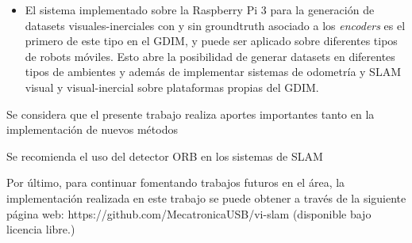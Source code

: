 \begin{itemize}
	\item  El sistema implementado sobre la Raspberry Pi 3 para la generación de datasets visuales-inerciales con y sin groundtruth asociado a los \textit{encoders} es el primero de este tipo en el GDIM, y puede ser aplicado sobre diferentes tipos de robots móviles. Esto abre la posibilidad de generar datasets en diferentes tipos de ambientes y además de implementar sistemas de odometría y SLAM visual y visual-inercial sobre plataformas propias del GDIM.
\end{itemize}


Se considera que el presente trabajo realiza aportes importantes tanto en la implementación de nuevos métodos 

Se recomienda el uso del detector ORB en los sistemas de SLAM  

Por último, para continuar fomentando trabajos futuros en el área, la implementación realizada en este trabajo se puede obtener a través de la siguiente página web:  https://github.com/MecatronicaUSB/vi-slam (disponible bajo licencia libre.)